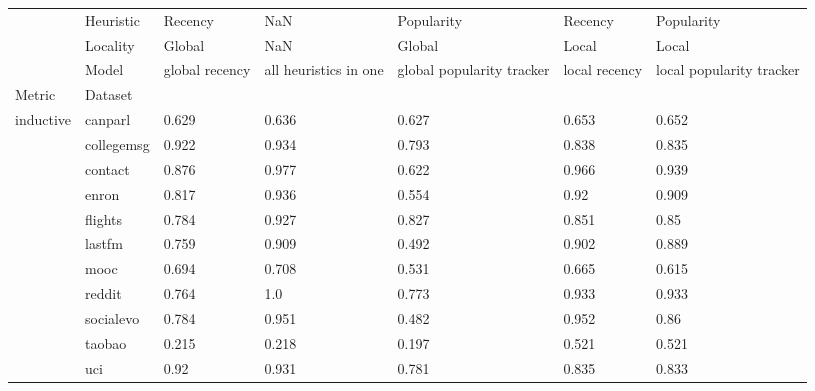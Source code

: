 \begin{tabular}{lllllll}
\toprule
             & Heuristic &        Recency &                   NaN &                Popularity &       Recency &               Popularity \\
             & Locality &         Global &                   NaN &                    Global &         Local &                    Local \\
             & Model & global recency & all heuristics in one & global popularity tracker & local recency & local popularity tracker \\
Metric & Dataset &                &                       &                           &               &                          \\
\midrule
inductive & canparl &          0.629 &                 0.636 &                     0.627 &         0.653 &                    0.652 \\
             & collegemsg &          0.922 &                 0.934 &                     0.793 &         0.838 &                    0.835 \\
             & contact &          0.876 &                 0.977 &                     0.622 &         0.966 &                    0.939 \\
             & enron &          0.817 &                 0.936 &                     0.554 &          0.92 &                    0.909 \\
             & flights &          0.784 &                 0.927 &                     0.827 &         0.851 &                     0.85 \\
             & lastfm &          0.759 &                 0.909 &                     0.492 &         0.902 &                    0.889 \\
             & mooc &          0.694 &                 0.708 &                     0.531 &         0.665 &                    0.615 \\
             & reddit &          0.764 &                   1.0 &                     0.773 &         0.933 &                    0.933 \\
             & socialevo &          0.784 &                 0.951 &                     0.482 &         0.952 &                     0.86 \\
             & taobao &          0.215 &                 0.218 &                     0.197 &         0.521 &                    0.521 \\
             & uci &           0.92 &                 0.931 &                     0.781 &         0.835 &                    0.833 \\

\end{tabular}

